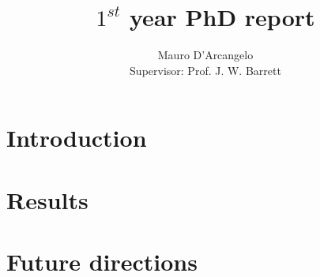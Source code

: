 \documentclass[12pt,a4paper]{article}
\title{$1^{st}$ year PhD report}
\author{Mauro D'Arcangelo \\ Supervisor: Prof. J. W. Barrett}
\date{}
\begin{document}
\maketitle


\tableofcontents

\section{Introduction}\label{intro}


\section{Results}\label{results}




\section{Future directions}\label{future}





\end{document}

